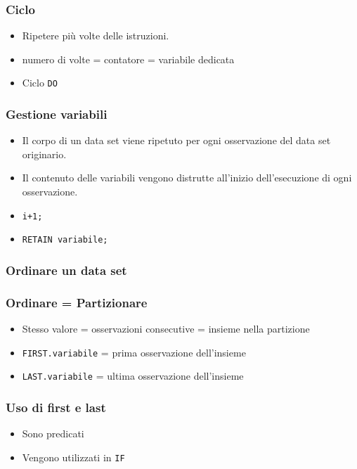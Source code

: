 \begin{frame}[containsverbatim]\frametitle{Ciclo}
  \begin{itemize}
  \item
    Ripetere pi{\`u} volte delle istruzioni.
  \item
    numero di volte = contatore = variabile dedicata
  \item
    Ciclo \verb+DO+
  \end{itemize}
\end{frame}



\begin{frame}[containsverbatim]\frametitle{Gestione variabili}
  \begin{itemize}
  \item
    Il corpo di un data set viene ripetuto per ogni osservazione del data set originario.
  \item
    Il contenuto delle variabili vengono distrutte all'inizio dell'esecuzione di ogni osservazione.
  \item
    \verb!i+1;!
  \item
    \verb!RETAIN variabile;!
  \end{itemize}\end{frame}



\begin{frame}[containsverbatim]\frametitle{Ordinare un data set}
\end{frame}

\begin{frame}\frametitle{Ordinare = Partizionare}
  \begin{itemize}
  \item
    Stesso valore = osservazioni consecutive = insieme nella partizione
  \item
    \texttt{FIRST.variabile} =
    prima osservazione dell'insieme
  \item
    \texttt{LAST.variabile} =
    ultima osservazione dell'insieme
  \end{itemize}\end{frame}

\begin{frame}\frametitle{Uso di first  e last}
  \begin{itemize}
  \item
    Sono predicati
  \item
    Vengono utilizzati in \texttt{IF}
  \end{itemize}\end{frame}

